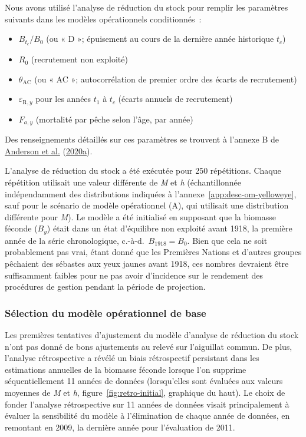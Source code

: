 \documentclass[11pt]{book}
\begin{document}
Nous avons utilisé l'analyse de réduction du stock pour remplir les paramètres suivants dans les modèles opérationnels conditionnés~:
\begin{itemize}

\item
  \(B_{t_c}/B_0\) (ou « D »; épuisement au cours de la dernière année historique \(t_c\))
\item
  \(R_0\) (recrutement non exploité)
\item
  \(\theta_\textrm{AC}\) (ou « AC »; autocorrélation de premier ordre des écarts de recrutement)
\item
  \(\varepsilon_{\textrm{R},y}\) pour les années \(t_1\) à \(t_c\) (écarts annuels de recrutement)
\item
  \(F_{a,y}\) (mortalité par pêche selon l'âge, par année)
\end{itemize}
Des renseignements détaillés sur ces paramètres se trouvent à l'annexe B de \protect\hyperlink{ref-anderson2020gfmp}{Anderson et al.} (\protect\hyperlink{ref-anderson2020gfmp}{2020a}).

L'analyse de réduction du stock a été exécutée pour 250 répétitions. Chaque répétition utilisait une valeur différente de \emph{M} et \emph{h} (échantillonnée indépendamment des distributions indiquées à l'annexe~\ref{app:desc-om-yelloweye}, sauf pour le scénario de modèle opérationnel (A), qui utilisait une distribution différente pour \emph{M}). Le modèle a été initialisé en supposant que la biomasse féconde (\(B_y\)) était dans un état d'équilibre non exploité avant 1918, la première année de la série chronologique, c.-à-d.~\(B_{1918} = B_0\). Bien que cela ne soit probablement pas vrai, étant donné que les Premières Nations et d'autres groupes pêchaient des sébastes aux yeux jaunes avant 1918, ces nombres devraient être suffisamment faibles pour ne pas avoir d'incidence sur le rendement des procédures de gestion pendant la période de projection.

\hypertarget{sec:approach3-conditioning-base-om}{%
\subsubsection{Sélection du modèle opérationnel de base}\label{sec:approach3-conditioning-base-om}}

Les premières tentatives d'ajustement du modèle d'analyse de réduction du stock n'ont pas donné de bons ajustements au relevé sur l'aiguillat commun. De plus, l'analyse rétrospective a révélé un biais rétrospectif persistant dans les estimations annuelles de la biomasse féconde lorsque l'on supprime séquentiellement 11 années de données (lorsqu'elles sont évaluées aux valeurs moyennes de \emph{M} et \emph{h}, figure~\ref{fig:retro-initial}, graphique du haut). Le choix de fonder l'analyse rétrospective sur 11 années de données visait principalement à évaluer la sensibilité du modèle à l'élimination de chaque année de données, en remontant en 2009, la dernière année pour l'évaluation de 2011.
\end{document}
